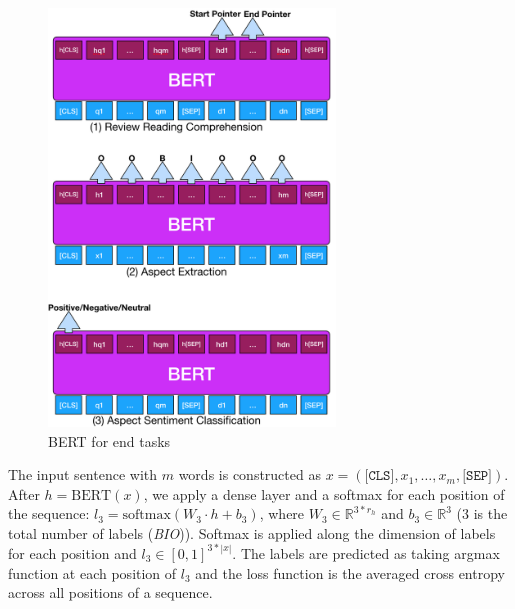 \begin{figure}[H]
\centering
\includegraphics[width=3.0in]{fig/naacl19_overview.png}
    \caption{BERT for end tasks}
\label{chap6:fig:overview}
\vspace{-3mm}
\end{figure}
The input sentence with $m$ words is constructed as $x=(\texttt{[CLS]}, x_1, \dots, x_m, \texttt{[SEP]})$.
After $h=\text{BERT}(x)$, we apply a dense layer and a softmax for each position of the sequence: $l_3=\text{softmax}(W_3 \cdot h + b_3)$, where $W_3 \in \mathbb{R}^{3*r_h}$ and $b_3 \in \mathbb{R}^3$ (3 is the total number of labels (\textit{BIO})).  Softmax is applied along the dimension of labels for each position and $l_3 \in [0, 1]^{3*|x|}$. The labels are predicted as taking argmax function at each position of $l_3$ and the loss function is the averaged cross entropy across all positions of a sequence.

